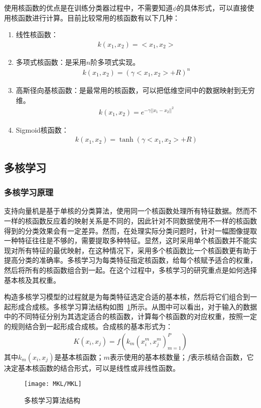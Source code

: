 使用核函数的优点是在训练分类器过程中，不需要知道$\phi$的具体形式，可以直接使用核函数进行计算。目前比较常用的核函数有以下几种：
\begin{enumerate}
\item 线性核函数：
	\begin{eqnarray}
	k(x_{1},x_{2})=<x_{1},x_{2}>
	\end{eqnarray}
\item 多项式核函数：是采用$n$阶多项式实现。
	\begin{eqnarray}
	k(x_{1},x_{2})=(\gamma<x_{1},x_{2}>+R)^{n}
	\end{eqnarray}
\item 高斯径向基核函数：是最常用的核函数，可以把低维空间中的数据映射到无穷维。
	\begin{eqnarray}
	k(x_{1},x_{2})=e^{-\gamma||x_{1}-x_{2}||^{2}}
	\end{eqnarray}
\item Sigmoid核函数：
	\begin{eqnarray}
	k(x_{1},x_{2})=\tanh(\gamma<x_{1},x_{2}>+R)
	\end{eqnarray}
\end{enumerate}

\subsection{多核学习}

\subsubsection{多核学习原理}

支持向量机是基于单核的分类算法，使用同一个核函数处理所有特征数据。然而不一样的核函数反应着的映射关系是不同的，因此针对不同数据使用不一样的核函数得到的分类效果会有一定差异。然而，在处理实际分类问题时，针对一幅图像提取一种特征往往是不够的，需要提取多种特征。显然，这时采用单个核函数并不能实现对所有特征的最优映射，在这种情况下，采用多个核函数比一个核函数更有助于提高分类的准确率。多核学习为每类特征指定核函数，给每个核赋予适合的权重，然后将所有的核函数组合到一起。在这个过程中，多核学习的研究重点是如何选择基本核及其权重。

构造多核学习模型的过程就是为每类特征选定合适的基本核，然后将它们组合到一起形成合成核。多核学习算法结构如图~\ref{fig:MKL}所示。从图中可以看出，对于输入的数据中的不同特征分别为其选定适合的核函数，计算每个核函数的对应权重，按照一定的规则结合到一起形成合成核。合成核的基本形式为：
\begin{eqnarray}
K(x_{i},x_{j})=f({k_{m}(x^{m}_{i},x^{m}_{j})}^{P}_{m=1})
\end{eqnarray}
其中$k_{m}(x_{i},x_{j})$是基本核函数；$m$表示使用的基本核数量；$f$表示核结合函数，它决定基本核函数的结合形式，可以是线性或非线性函数。
\begin{figure}[H] %
  \centering
  \texttt{[image: MKL/MKL]}
  \caption{多核学习算法结构}
  \label{fig:MKL}
\end{figure}



